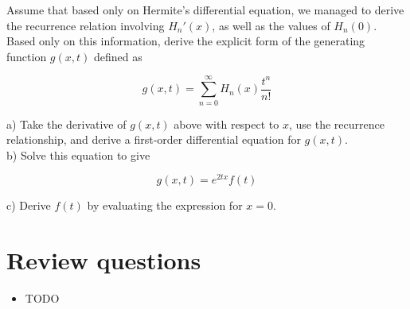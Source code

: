 \begin{sidebar}
\begin{ex}
Assume that based only on Hermite's differential equation, we managed to derive the recurrence relation involving $H_n'(x)$, as well as the values of $H_n(0)$. Based only on this information, derive the explicit form of the generating function $g(x,t)$ defined as

$$g(x,t) = \sum_{n = 0}^{\infty} H_n(x)\frac{t^n}{n!} $$

a) Take the derivative of $g(x,t)$ above with respect to $x$, use the recurrence relationship, and derive a first-order differential equation for $g(x,t)$.\\

b) Solve this equation to give

$$g(x,t) = e^{2tx} f(t)$$

c) Derive $f(t)$ by evaluating the expression for $x=0$.
\end{ex}
\end{sidebar}

\section*{Review questions}

\begin{itemize}
\item TODO
\end{itemize}


